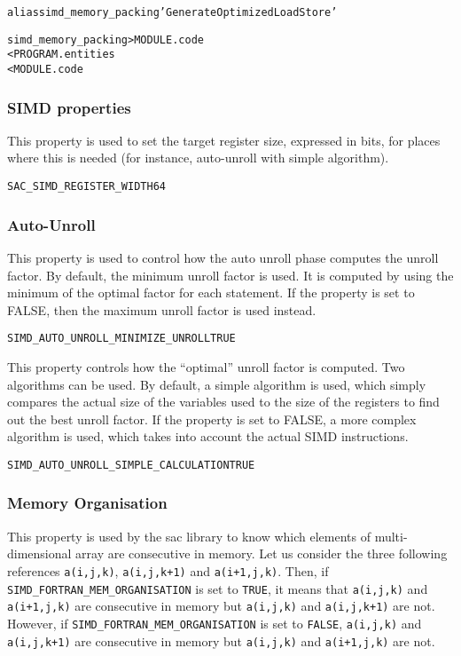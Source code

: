 \documentclass[a4paper]{report}
\newenvironment{PipsProp}{\begin{alltt}}{\end{alltt}}
\newenvironment{PipsMake}{\begin{alltt}}{\end{alltt}}
\begin{document}
\begin{PipsMake}
alias simd_memory_packing 'Generate Optimized Load Store'

simd_memory_packing  > MODULE.code
        < PROGRAM.entities
        < MODULE.code
\end{PipsMake}

\subsubsection{SIMD properties}

This property is used to set the target register size, expressed in
bits, for places where this is needed (for instance, auto-unroll with
simple algorithm).

\begin{PipsProp}
SAC_SIMD_REGISTER_WIDTH 64
\end{PipsProp}

\subsubsection*{Auto-Unroll}

This property is used to control how the auto unroll phase computes
the unroll factor. By default, the minimum unroll factor is used. It
is computed by using the minimum of the optimal factor for each
statement. If the property is set to FALSE, then the maximum unroll
factor is used instead.

\begin{PipsProp}
SIMD_AUTO_UNROLL_MINIMIZE_UNROLL TRUE
\end{PipsProp}

This property controls how the ``optimal'' unroll factor is
computed. Two algorithms can be used. By default, a simple algorithm
is used, which simply compares the actual size of the variables used
to the size of the registers to find out the best unroll factor.
If the property is set to FALSE, a more complex algorithm is used,
which takes into account the actual SIMD instructions.

\begin{PipsProp}
SIMD_AUTO_UNROLL_SIMPLE_CALCULATION TRUE
\end{PipsProp}

\subsubsection*{Memory Organisation}

This property is used by the sac library to know which elements of
multi-dimensional array are consecutive in memory. Let us consider the
three following references \lstinline|a(i,j,k)|, \lstinline|a(i,j,k+1)|
and \lstinline|a(i+1,j,k)|.  Then, if \verb|SIMD_FORTRAN_MEM_ORGANISATION|
is set to \texttt{TRUE}, it means that \lstinline|a(i,j,k)| and
\lstinline|a(i+1,j,k)| are consecutive in memory but \lstinline|a(i,j,k)|
and \lstinline|a(i,j,k+1)| are not. However, if
\verb|SIMD_FORTRAN_MEM_ORGANISATION| is set to \texttt{FALSE},
\lstinline|a(i,j,k)| and \lstinline|a(i,j,k+1)| are consecutive in memory
but \lstinline|a(i,j,k)| and \lstinline|a(i+1,j,k)| are not.
\end{document}
